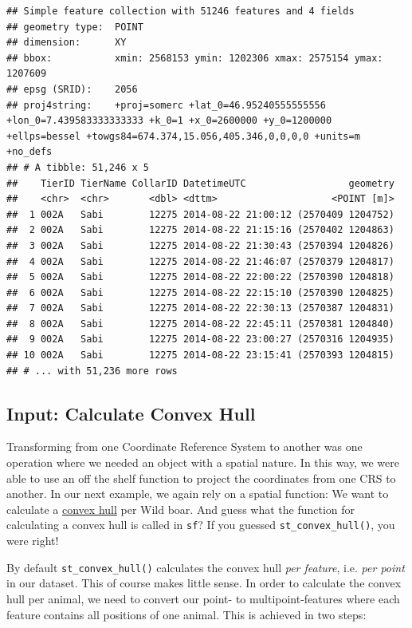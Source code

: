 \documentclass[]{book}
\begin{document}
\begin{verbatim}
## Simple feature collection with 51246 features and 4 fields
## geometry type:  POINT
## dimension:      XY
## bbox:           xmin: 2568153 ymin: 1202306 xmax: 2575154 ymax: 1207609
## epsg (SRID):    2056
## proj4string:    +proj=somerc +lat_0=46.95240555555556 +lon_0=7.439583333333333 +k_0=1 +x_0=2600000 +y_0=1200000 +ellps=bessel +towgs84=674.374,15.056,405.346,0,0,0,0 +units=m +no_defs
## # A tibble: 51,246 x 5
##    TierID TierName CollarID DatetimeUTC                  geometry
##    <chr>  <chr>       <dbl> <dttm>                    <POINT [m]>
##  1 002A   Sabi        12275 2014-08-22 21:00:12 (2570409 1204752)
##  2 002A   Sabi        12275 2014-08-22 21:15:16 (2570402 1204863)
##  3 002A   Sabi        12275 2014-08-22 21:30:43 (2570394 1204826)
##  4 002A   Sabi        12275 2014-08-22 21:46:07 (2570379 1204817)
##  5 002A   Sabi        12275 2014-08-22 22:00:22 (2570390 1204818)
##  6 002A   Sabi        12275 2014-08-22 22:15:10 (2570390 1204825)
##  7 002A   Sabi        12275 2014-08-22 22:30:13 (2570387 1204831)
##  8 002A   Sabi        12275 2014-08-22 22:45:11 (2570381 1204840)
##  9 002A   Sabi        12275 2014-08-22 23:00:27 (2570316 1204935)
## 10 002A   Sabi        12275 2014-08-22 23:15:41 (2570393 1204815)
## # ... with 51,236 more rows
\end{verbatim}

\hypertarget{input-calculate-convex-hull}{%
\subsection{Input: Calculate Convex Hull}\label{input-calculate-convex-hull}}

Transforming from one Coordinate Reference System to another was one operation where we needed an object with a spatial nature. In this way, we were able to use an off the shelf function to project the coordinates from one CRS to another. In our next example, we again rely on a spatial function: We want to calculate a \href{https://en.wikipedia.org/wiki/Convex_hull}{convex hull} per Wild boar. And guess what the function for calculating a convex hull is called in \texttt{sf}? If you guessed \texttt{st\_convex\_hull()}, you were right!

By default \texttt{st\_convex\_hull()} calculates the convex hull \emph{per feature}, i.e. \emph{per point} in our dataset. This of course makes little sense. In order to calculate the convex hull per animal, we need to convert our point- to multipoint-features where each feature contains all positions of one animal. This is achieved in two steps:
\end{document}
